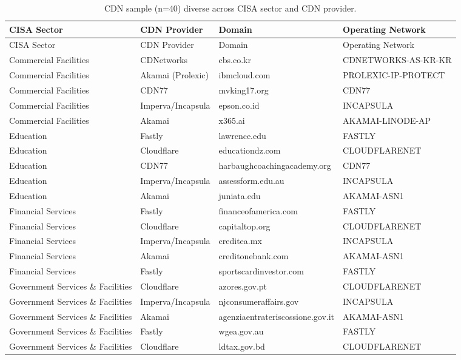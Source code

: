 \documentclass{article}
\begin{document}
\begin{longtable}{l l l l}
\caption{CDN sample (n=40) diverse across CISA sector and CDN provider.} \label{tab:cdn_sample_diverse} \\
\toprule
CISA Sector & CDN Provider & Domain & Operating Network \\
\midrule
\endfirsthead
\toprule
CISA Sector & CDN Provider & Domain & Operating Network \\
\midrule
\endhead
\bottomrule
\endfoot
Commercial Facilities & CDNetworks & cbs.co.kr & CDNETWORKS-AS-KR-KR \\
Commercial Facilities & Akamai (Prolexic) & ibmcloud.com & PROLEXIC-IP-PROTECT \\
Commercial Facilities & CDN77 & mvking17.org & CDN77 \\
Commercial Facilities & Imperva/Incapsula & epson.co.id & INCAPSULA \\
Commercial Facilities & Akamai & x365.ai & AKAMAI-LINODE-AP \\
Education & Fastly & lawrence.edu & FASTLY \\
Education & Cloudflare & educationdz.com & CLOUDFLARENET \\
Education & CDN77 & harbaughcoachingacademy.org & CDN77 \\
Education & Imperva/Incapsula & assessform.edu.au & INCAPSULA \\
Education & Akamai & juniata.edu & AKAMAI-ASN1 \\
Financial Services & Fastly & financeofamerica.com & FASTLY \\
Financial Services & Cloudflare & capitaltop.org & CLOUDFLARENET \\
Financial Services & Imperva/Incapsula & creditea.mx & INCAPSULA \\
Financial Services & Akamai & creditonebank.com & AKAMAI-ASN1 \\
Financial Services & Fastly & sportscardinvestor.com & FASTLY \\
Government Services \& Facilities & Cloudflare & azores.gov.pt & CLOUDFLARENET \\
Government Services \& Facilities & Imperva/Incapsula & njconsumeraffairs.gov & INCAPSULA \\
Government Services \& Facilities & Akamai & agenziaentrateriscossione.gov.it & AKAMAI-ASN1 \\
Government Services \& Facilities & Fastly & wgea.gov.au & FASTLY \\
Government Services \& Facilities & Cloudflare & ldtax.gov.bd & CLOUDFLARENET \\

\end{longtable}
\end{document}
